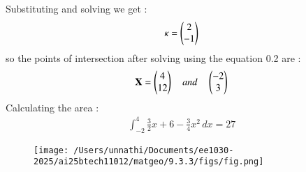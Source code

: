 \documentclass[journal]{IEEEtran}
\begin{document}
Substituting and solving we get :
\begin{align}
 \kappa = \begin{pmatrix}2 \\ -1\end{pmatrix}
\end{align}
so the points of intersection after solving using the equation 0.2 are :
\begin{align}
    \mathbf{X} = \begin{pmatrix}4 \\ 12 \end{pmatrix} \quad and \quad \begin{pmatrix}-2\\3\end{pmatrix}
\end{align}
Calculating the area  :
\begin{align}
    \int_{-2}^{4} \frac{3}{2}x + 6 - \frac{3}{4}x^2\,dx = 27 
\end{align}



\begin{figure}[h!]
   \centering
   \texttt{[image: /Users/unnathi/Documents/ee1030-2025/ai25btech11012/matgeo/9.3.3/figs/fig.png]}
   \caption{}
   \label{stemplot}
\end{figure}
\end{document}
